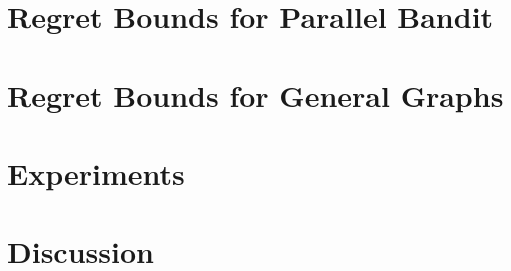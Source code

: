 \documentclass{article}
\theoremstyle{plain}
\theoremstyle{definition}
\begin{document}
\section{Regret Bounds for Parallel Bandit}
\label{sec:simple-regret}




\section{Regret Bounds for General Graphs}
\label{sec:simple-regret-general}

 


\section{Experiments}
\label{sec:experiments}


\section{Discussion}
\label{sec:discussion}







\onecolumn


\end{document}
